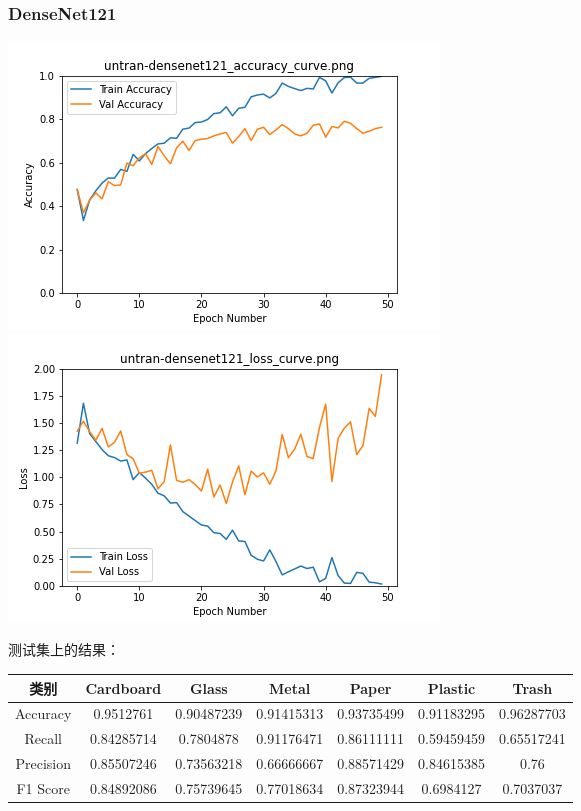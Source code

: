 \documentclass[UTF8]{ctexart}
\begin{document}
\subsubsection{DenseNet121}
\includegraphics[scale=0.5]{image/untran-densenet121_accuracy_curve.png} 
\includegraphics[scale=0.5]{image/untran-densenet121_loss_curve.png} 

测试集上的结果：

\begin{tabular}{|c|c|c|c|c|c|c|}
\hline 
类别 & Cardboard & Glass & Metal & Paper & Plastic & Trash \\ 
\hline 
Accuracy &0.9512761&  0.90487239& 0.91415313& 0.93735499& 0.91183295& 0.96287703\\
 \hline 
Recall &0.84285714& 0.7804878 & 0.91176471& 0.86111111& 0.59459459& 0.65517241\\ 
\hline 
Precision &0.85507246& 0.73563218 &0.66666667& 0.88571429& 0.84615385& 0.76 \\ 
\hline 
F1 Score &0.84892086 &0.75739645 &0.77018634& 0.87323944& 0.6984127 & 0.7037037\\ 
\hline 
\end{tabular}
\end{document}
